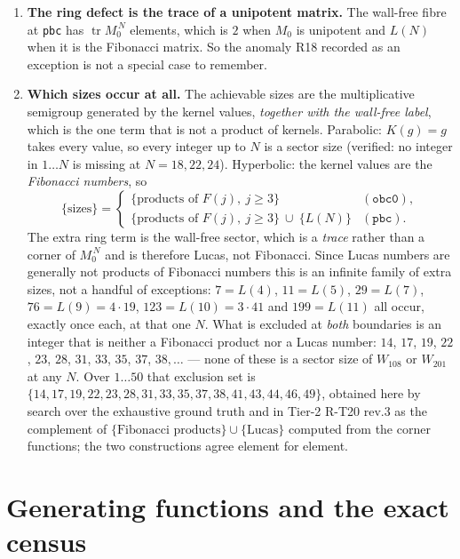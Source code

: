\documentclass[11pt]{article}
\newcommand{\rt}[1]{\texttt{#1}}
\theoremstyle{plain}
\theoremstyle{remark}
\begin{document}
\begin{enumerate}
\item \textbf{The ring defect is the trace of a unipotent matrix.} The wall-free
fibre at \rt{pbc} has $\operatorname{tr}M_0^{\,N}$ elements, which is $2$ when
$M_0$ is unipotent and $L(N)$ when it is the Fibonacci matrix. So the anomaly R18
recorded as an exception is not a special case to remember.

\item \textbf{Which sizes occur at all.} The achievable sizes are the
multiplicative semigroup generated by the kernel values, \emph{together with the
wall-free label}, which is the one term that is not a product of kernels.
Parabolic: $K(g)=g$ takes every value, so every integer up to $N$ is a sector
size (verified: no integer in $1\ldots N$ is missing at $N=18,22,24$).
Hyperbolic: the kernel values are the \emph{Fibonacci numbers}, so
\[
\{\text{sizes}\} =
\begin{cases}
\{\text{products of } F(j),\ j\ge3\} & (\rt{obc0}),\\[2pt]
\{\text{products of } F(j),\ j\ge3\}\ \cup\ \{L(N)\} & (\rt{pbc}).
\end{cases}
\]
The extra ring term is the wall-free sector, which is a \emph{trace} rather than
a corner of $M_0^{\,N}$ and is therefore Lucas, not Fibonacci. Since Lucas
numbers are generally not products of Fibonacci numbers this is an infinite
family of extra sizes, not a handful of exceptions: $7=L(4)$, $11=L(5)$,
$29=L(7)$, $76=L(9)=4\cdot19$, $123=L(10)=3\cdot41$ and $199=L(11)$ all occur,
exactly once each, at that one $N$. What is excluded at \emph{both} boundaries is
an integer that is neither a Fibonacci product nor a Lucas number: $14$, $17$,
$19$, $22$, $23$, $28$, $31$, $33$, $35$, $37$, $38,\ldots$ --- none of these is
a sector size of $W_{108}$ or $W_{201}$ at any $N$. Over $1\ldots50$ that
exclusion set is
$\{14,17,19,22,23,28,31,33,35,37,38,41,43,44,46,49\}$, obtained here by search
over the exhaustive ground truth and in Tier-2 R-T20 rev.3 as the complement of
$\{\text{Fibonacci products}\}\cup\{\text{Lucas}\}$ computed from the corner
functions; the two constructions agree element for element.
\end{enumerate}

\section{Generating functions and the exact census}
\end{document}
